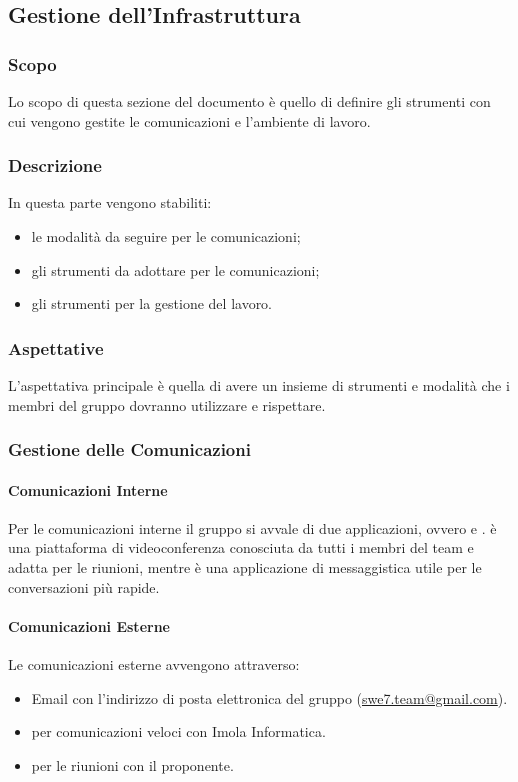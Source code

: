 \subsection{Gestione dell'Infrastruttura}
\subsubsection{Scopo}
Lo scopo di questa sezione del documento è quello di definire gli strumenti con cui vengono gestite le 
comunicazioni e l'ambiente di lavoro.

\subsubsection{Descrizione}
In questa parte vengono stabiliti:
\begin{itemize}
    \item le modalità da seguire per le comunicazioni;
    \item gli strumenti da adottare per le comunicazioni;
    \item gli strumenti per la gestione del lavoro.
\end{itemize}

\subsubsection{Aspettative}
L'aspettativa principale è quella di avere un insieme di strumenti e modalità che i membri del gruppo 
dovranno utilizzare e rispettare.

\subsubsection{Gestione delle Comunicazioni} 
\paragraph{Comunicazioni Interne} \hfill \break
Per le comunicazioni interne il gruppo si avvale di due applicazioni, ovvero  e 
.  è una piattaforma di videoconferenza conosciuta da tutti i membri del 
team e adatta per le riunioni, mentre  è una applicazione di messaggistica utile per le 
conversazioni più rapide.

\paragraph{Comunicazioni Esterne} \hfill \break
Le comunicazioni esterne avvengono attraverso:
\begin{itemize}
    \item Email con l'indirizzo di posta elettronica del gruppo 
        (\href{mailto:swe7.team@gmail.com}{swe7.team@gmail.com}).
    \item {} per comunicazioni veloci con Imola Informatica.
    \item {} per le riunioni con il proponente.
\end{itemize}

